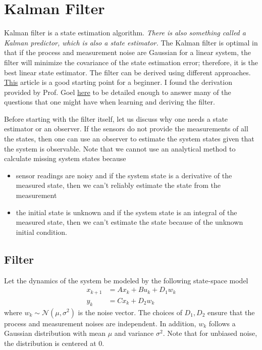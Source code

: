 \section{Kalman Filter}
\hspace{\parindent}Kalman filter is a state estimation algorithm. \textit{There is also something called a Kalman predictor, which is also a state estimator.} The Kalman filter is optimal in that if the process and measurement noise are Gaussian for a linear system, the filter will minimize the covariance of the state estimation error; therefore, it is the best linear state estimator. The filter can be derived using different approaches. \href{https://ieeexplore.ieee.org/document/6279585}{This} article is a good starting point for a beginner. I found the derivation provided by Prof. Goel \href{https://www.youtube.com/watch?v=bVj_EfWFvqs}{here} to be detailed enough to answer many of the questions that one might have when learning and deriving the filter.

Before starting with the filter itself, let us discuss why one needs a state estimator or an observer. If the sensors do not provide the measurements of all the states, then one can use an observer to estimate the system states given that the system is observable. Note that we cannot use an analytical method to calculate missing system states because
\begin{itemize}
    \item sensor readings are noisy and if the system state is a derivative of the measured state, then we can't reliably estimate the state from the measurement
    \item the initial state is unknown and if the system state is an integral of the measured state, then we can't estimate the state because of the unknown initial condition.
\end{itemize}

\subsection{Filter}
\hspace{\parindent}Let the dynamics of the system be modeled by the following state-space model
\begin{align}
    x_{k+1} &= A x_k + B u_k + D_1 w_k \\
    y_k &= C x_k + D_2 w_k
    \label{eqn:stateSpaceModelWNoise}
\end{align}
where $w_k \sim\mathcal{N}(\mu, \sigma^2)$ is the noise vector. The choices of $D_1, D_2$ ensure that the process and measurement noises are independent. In addition, $w_k$ follows a Gaussian distribution with mean $\mu$ and variance $\sigma^2$. Note that for unbiased noise, the distribution is centered at $0$.

